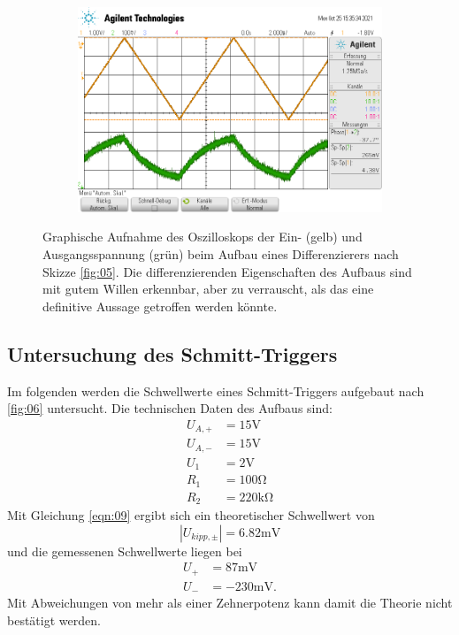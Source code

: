 \begin{figure}
\begin{subfigure}{0.35\textwidth}
    \includegraphics[width=\textwidth]{ressources/differential_dreieck.png}
  \end{subfigure}
  \caption{Graphische Aufnahme des Oszilloskops der Ein- (gelb) und Ausgangsspannung (grün) beim Aufbau eines Differenzierers nach Skizze \ref{fig:05}. Die differenzierenden Eigenschaften des Aufbaus sind mit gutem Willen erkennbar, aber zu verrauscht, als das eine definitive Aussage getroffen werden könnte.}
  \label{fig:Osz_d}
\end{figure}
\FloatBarrier
\subsection{Untersuchung des Schmitt-Triggers}
Im folgenden werden die Schwellwerte eines Schmitt-Triggers aufgebaut nach \ref{fig:06} untersucht. Die technischen Daten des Aufbaus sind:
\begin{align}
  U_{A,+} &= 15\si{\volt}\\
  U_{A,-} &= 15\si{\volt}\\
  U_{1}   &= 2\si{\volt}\\
  R_{1}   &= 100\si{\ohm}\\
  R_{2}   &= 220\si{\kilo\ohm}
\end{align}
Mit Gleichung \ref{eqn:09} ergibt sich ein theoretischer Schwellwert von
\begin{equation}
  \left|U_{kipp,\pm}\right| = 6.82\si{\milli\volt}
\end{equation}
und die gemessenen Schwellwerte liegen bei
\begin{align}
  U_+ &= 87 \si{\milli\volt}\\
  U_- &= -230 \si{\milli\volt}.
\end{align}
Mit Abweichungen von mehr als einer Zehnerpotenz kann damit die Theorie nicht bestätigt werden.
